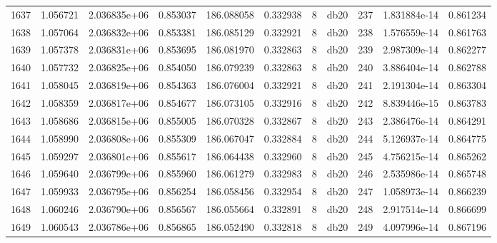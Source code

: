\begin{tabular}{lrrrrrrlrrr}
1637 &    1.056721 &        2.036835e+06 &  0.853037 &              186.088058 &    0.332938 &       8 &         db20 &    237 &   1.831884e-14 &      0.861234 \\
1638 &    1.057064 &        2.036832e+06 &  0.853381 &              186.085129 &    0.332921 &       8 &         db20 &    238 &   1.576559e-14 &      0.861763 \\
1639 &    1.057378 &        2.036831e+06 &  0.853695 &              186.081970 &    0.332863 &       8 &         db20 &    239 &   2.987309e-14 &      0.862277 \\
1640 &    1.057732 &        2.036825e+06 &  0.854050 &              186.079239 &    0.332863 &       8 &         db20 &    240 &   3.886404e-14 &      0.862788 \\
1641 &    1.058045 &        2.036819e+06 &  0.854363 &              186.076004 &    0.332921 &       8 &         db20 &    241 &   2.191304e-14 &      0.863304 \\
1642 &    1.058359 &        2.036817e+06 &  0.854677 &              186.073105 &    0.332916 &       8 &         db20 &    242 &   8.839446e-15 &      0.863783 \\
1643 &    1.058686 &        2.036815e+06 &  0.855005 &              186.070328 &    0.332867 &       8 &         db20 &    243 &   2.386476e-14 &      0.864291 \\
1644 &    1.058990 &        2.036808e+06 &  0.855309 &              186.067047 &    0.332884 &       8 &         db20 &    244 &   5.126937e-14 &      0.864775 \\
1645 &    1.059297 &        2.036801e+06 &  0.855617 &              186.064438 &    0.332960 &       8 &         db20 &    245 &   4.756215e-14 &      0.865262 \\
1646 &    1.059640 &        2.036799e+06 &  0.855960 &              186.061279 &    0.332983 &       8 &         db20 &    246 &   2.535986e-14 &      0.865748 \\
1647 &    1.059933 &        2.036795e+06 &  0.856254 &              186.058456 &    0.332954 &       8 &         db20 &    247 &   1.058973e-14 &      0.866239 \\
1648 &    1.060246 &        2.036790e+06 &  0.856567 &              186.055664 &    0.332891 &       8 &         db20 &    248 &   2.917514e-14 &      0.866699 \\
1649 &    1.060543 &        2.036786e+06 &  0.856865 &              186.052490 &    0.332818 &       8 &         db20 &    249 &   4.097996e-14 &      0.867196 \\

\end{tabular}
